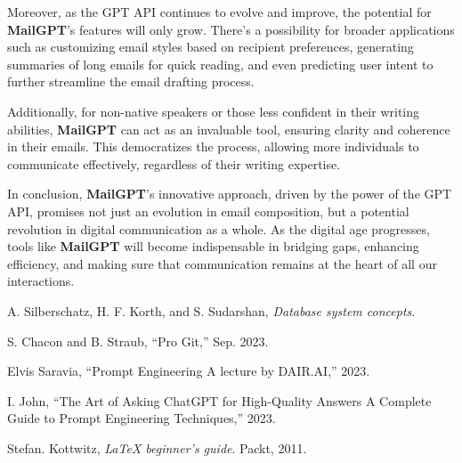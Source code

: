\documentclass[12pt]{article}
\begin{document}
Moreover, as the GPT API continues to evolve and improve, the potential for \textbf{MailGPT}'s features will only grow. There's a possibility for broader applications such as customizing email styles based on recipient preferences, generating summaries of long emails for quick reading, and even predicting user intent to further streamline the email drafting process.

Additionally, for non-native speakers or those less confident in their writing abilities, \textbf{MailGPT} can act as an invaluable tool, ensuring clarity and coherence in their emails. This democratizes the process, allowing more individuals to communicate effectively, regardless of their writing expertise.

In conclusion, \textbf{MailGPT}'s innovative approach, driven by the power of the GPT API, promises not just an evolution in email composition, but a potential revolution in digital communication as a whole. As the digital age progresses, tools like \textbf{MailGPT} will become indispensable in bridging gaps, enhancing efficiency, and making sure that communication remains at the heart of all our interactions.


\begin{thebibliography}{99}
		
	A. Silberschatz, H. F. Korth, and S. Sudarshan, 
	\textit{Database system concepts}.
		
	S. Chacon and B. Straub, 
	``Pro Git,'' 
	Sep. 2023.
		
	Elvis Saravia, 
	``Prompt Engineering A lecture by DAIR.AI,'' 
	2023.
		
	I. John, 
	``The Art of Asking ChatGPT for High-Quality Answers A Complete Guide to Prompt Engineering Techniques,'' 
	2023.
		
	Stefan. Kottwitz, 
	\textit{LaTeX beginner’s guide}. 
	Packt, 2011.
		
\end{thebibliography}
\end{document}
